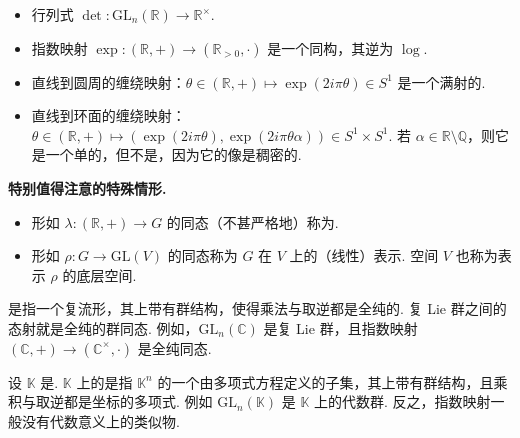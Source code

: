 \begin{example*}
\begin{itemize}
\item 行列式 $\det\colon\mathrm{GL}_n(\mathbb{R})\longrightarrow\mathbb{R}^{\times}$.
\item 指数映射 $\exp\colon(\mathbb{R},+)\longrightarrow(\mathbb{R}_{>0},\cdot)$ 是一个同构，其逆为 $\log$.
\item 直线到圆周的缠绕映射：$\theta\in(\mathbb{R},+)\mapsto\exp(2i\pi\theta)\in S^{1}$ 是一个满射的.
\item 直线到环面的缠绕映射：$\theta\in(\mathbb{R},+)\mapsto(\exp(2i\pi\theta),\exp(2i\pi\theta\alpha))\in S^{1}\times S^{1}$. 若 $\alpha\in\mathbb{R}\setminus\mathbb{Q}$，则它是一个单的，但不是，因为它的像是稠密的.
\end{itemize}
\end{example*}

\textbf{特别值得注意的特殊情形.}
\begin{itemize}
\item 形如 $\lambda\colon(\mathbb{R},+)\longrightarrow G$ 的同态（不甚严格地）称为.
\item 形如 $\rho\colon G\longrightarrow\mathrm{GL}(V)$ 的同态称为 $G$ 在 $V$ 上的（线性）表示. 空间 $V$ 也称为表示 $\rho$ 的底层空间.
\end{itemize}

\begin{numpara}[全纯变体]\label{np:ssl-1-2-4}
是指一个复流形，其上带有群结构，使得乘法与取逆都是全纯的. 复 Lie 群之间的态射就是全纯的群同态. 例如，$\mathrm{GL}_n(\mathbb{C})$ 是复 Lie 群，且指数映射 $(\mathbb{C},+)\longrightarrow(\mathbb{C}^{\times},\cdot)$ 是全纯同态.
\end{numpara}

\begin{numpara}[代数变体]\label{np:ssl-1-2-5}
设 $\mathbb{K}$ 是. $\mathbb{K}$ 上的是指 $\mathbb{K}^{n}$ 的一个由多项式方程定义的子集，其上带有群结构，且乘积与取逆都是坐标的多项式. 例如 $\mathrm{GL}_n(\mathbb{K})$ 是 $\mathbb{K}$ 上的代数群. 反之，指数映射一般没有代数意义上的类似物.
\end{numpara}

